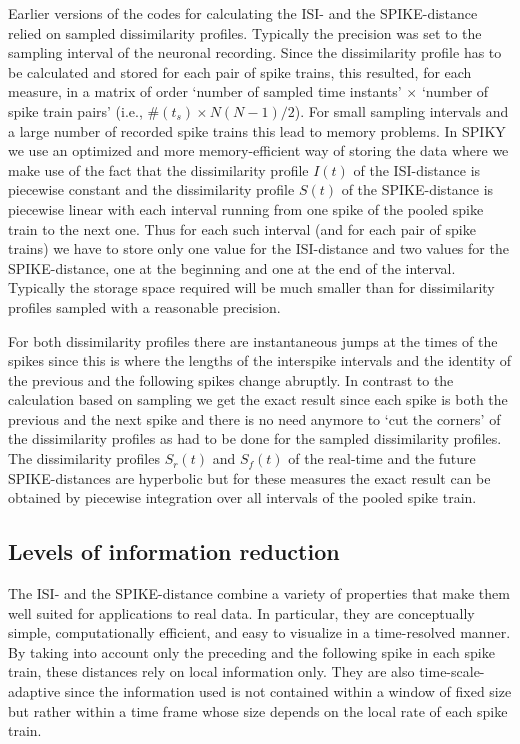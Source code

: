 \documentclass[10pt,twocolumn]{elsart5p}
\begin{document}
Earlier versions of the codes for calculating the ISI- and the SPIKE-distance relied on sampled dissimilarity profiles. Typically the precision was set to the sampling interval of the neuronal recording. Since the dissimilarity profile has to be calculated and stored for each pair of spike trains, this resulted, for each measure, in a matrix of order `number of sampled time instants' $\times$ `number of spike train pairs' (i.e., $\# (t_s) \times N(N-1)/2$). For small sampling intervals and a large number of recorded spike trains this lead to memory problems.
In SPIKY we use an optimized and more memory-efficient way of storing the data where we make use of the fact that the dissimilarity profile $I (t)$ of the ISI-distance is piecewise constant and the dissimilarity profile $S (t)$ of the SPIKE-distance is piecewise linear with each interval running from one spike of the pooled spike train to the next one. Thus for each such interval (and for each pair of spike trains) we have to store only one value for the ISI-distance and two values for the SPIKE-distance, one at the beginning and one at the end of the interval. Typically the storage space required will be much smaller than for dissimilarity profiles sampled with a reasonable precision.

For both dissimilarity profiles there are instantaneous jumps at the times of the spikes since this is where the lengths of the interspike intervals and the identity of the previous and the following spikes change abruptly. In contrast to the calculation based on sampling we get the exact result since each spike is both the previous and the next spike and there is no need anymore to `cut the corners' of the dissimilarity profiles as had to be done for the sampled dissimilarity profiles. The dissimilarity profiles $S_r(t)$ and $S_f (t)$ of the real-time and the future SPIKE-distances are hyperbolic but for these measures the exact result can be obtained by piecewise integration over all intervals of the pooled spike train.


\subsection{\label{ss:Information-reduction} Levels of information reduction}

The ISI- and the SPIKE-distance combine a variety of properties that make them well suited for applications to real data. In particular, they are conceptually simple, computationally efficient, and easy to visualize in a time-resolved manner. By taking into account only the preceding and the following spike in each spike train, these distances rely on local information only. They are also time-scale-adaptive since the information used is not contained within a window of fixed size but rather within a time frame whose size depends on the local rate of each spike train.
\end{document}

